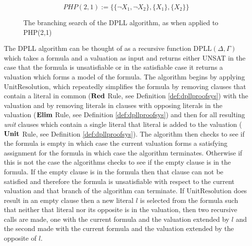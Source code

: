 $$PHP(2,1) := \{\{\neg X_1, \neg X_2\}, \{ X_1 \}, \{ X_2 \} \}$$


\bigskip
\begin{figure}[h!]
\begin{center}
\end{center}
\caption{The branching search of the DPLL algorithm, as when applied to PHP(2,1)}
\end{figure}
\bigskip

The DPLL algorithm can be thought of as a recursive function $\mathrm{DPLL}(\Delta,\Gamma)$ which takes a formula and a valuation as input and returns either UNSAT in the case that the formula is unsatisfiable or in the satisfiable case it returns a valuation which forms a model of the formula.  The algorithm begins by applying $\mathrm{UnitResolution}$, which repeatedly simplifies the formula by removing clauses that contain a literal in common ($\mathbf{Red}$ Rule, see Definition \ref{def:dpllproofsys}) with the valuation and by removing literals in clauses with opposing literals in the valuation ($\mathbf{Elim}$ Rule, see Definition \ref{def:dpllproofsys}) and then for all resulting \emph{unit} clauses which contain a single literal that literal is added to the valuation ($\mathbf{Unit}$ Rule, see Definition \ref{def:dpllproofsys}).  The algorithm then checks to see if the formula is empty in which case the current valuation forms a satisfying assignment for the formula in which case the algorithm terminates.  Otherwise if this is not the case the algorithms checks to see if the empty clause is in the formula. If the empty clause is in the formula then that clause can not be satisfied and therefore the formula is unsatisfiable with respect to the current valuation and that branch of the algorithm can terminate. If $\mathrm{UnitResolution}$ does result in an empty clause then a new literal $l$ is selected from the formula such that neither that literal nor its opposite is in the valuation, then two recursive calls are made, one with the current formula and the valuation extended by $l$ and the second made with the current formula and the valuation extended by the opposite of $l$. 

